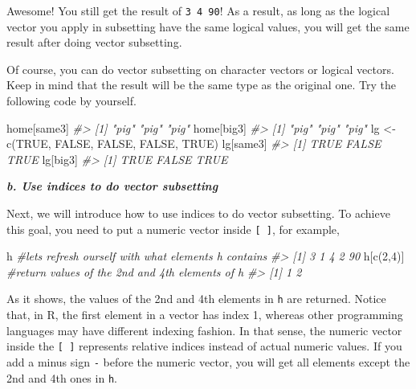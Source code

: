 \documentclass[
]{book}
\newenvironment{Shaded}{\begin{snugshade}}{\end{snugshade}}
\newcommand{\CommentTok}[1]{\textcolor[rgb]{0.56,0.35,0.01}{\textit{#1}}}
\newcommand{\ConstantTok}[1]{\textcolor[rgb]{0.00,0.00,0.00}{#1}}
\newcommand{\DecValTok}[1]{\textcolor[rgb]{0.00,0.00,0.81}{#1}}
\newcommand{\FunctionTok}[1]{\textcolor[rgb]{0.00,0.00,0.00}{#1}}
\newcommand{\NormalTok}[1]{#1}
\newcommand{\OtherTok}[1]{\textcolor[rgb]{0.56,0.35,0.01}{#1}}
\begin{document}
Awesome! You still get the result of \texttt{3\ 4\ 90}! As a result, as long as the logical vector you apply in subsetting have the same logical values, you will get the same result after doing vector subsetting.

Of course, you can do vector subsetting on character vectors or logical vectors. Keep in mind that the result will be the same type as the original one. Try the following code by yourself.

\begin{Shaded}
\begin{Highlighting}[]
\NormalTok{home[same3]}
\CommentTok{\#\textgreater{} [1] "pig" "pig" "pig"}
\NormalTok{home[big3]}
\CommentTok{\#\textgreater{} [1] "pig" "pig" "pig"}
\NormalTok{lg }\OtherTok{\textless{}{-}} \FunctionTok{c}\NormalTok{(}\ConstantTok{TRUE}\NormalTok{, }\ConstantTok{FALSE}\NormalTok{, }\ConstantTok{FALSE}\NormalTok{, }\ConstantTok{FALSE}\NormalTok{, }\ConstantTok{TRUE}\NormalTok{)}
\NormalTok{lg[same3]}
\CommentTok{\#\textgreater{} [1]  TRUE FALSE  TRUE}
\NormalTok{lg[big3]}
\CommentTok{\#\textgreater{} [1]  TRUE FALSE  TRUE}
\end{Highlighting}
\end{Shaded}

\textbf{\emph{b. Use indices to do vector subsetting}}

Next, we will introduce how to use indices to do vector subsetting. To achieve this goal, you need to put a numeric vector inside \texttt{{[}\ {]}}, for example,

\begin{Shaded}
\begin{Highlighting}[]
\NormalTok{h }\CommentTok{\#let\textquotesingle{}s refresh ourself with what elements h contains}
\CommentTok{\#\textgreater{} [1]  3  1  4  2 90}
\NormalTok{h[}\FunctionTok{c}\NormalTok{(}\DecValTok{2}\NormalTok{,}\DecValTok{4}\NormalTok{)]  }\CommentTok{\#return values of the 2nd and 4th elements of h}
\CommentTok{\#\textgreater{} [1] 1 2}
\end{Highlighting}
\end{Shaded}

As it shows, the values of the 2nd and 4th elements in \texttt{h} are returned. Notice that, in R, the first element in a vector has index 1, whereas other programming languages may have different indexing fashion. In that sense, the numeric vector inside the \texttt{{[}\ {]}} represents relative indices instead of actual numeric values. If you add a minus sign \texttt{-} before the numeric vector, you will get all elements except the 2nd and 4th ones in \texttt{h}.
\end{document}
